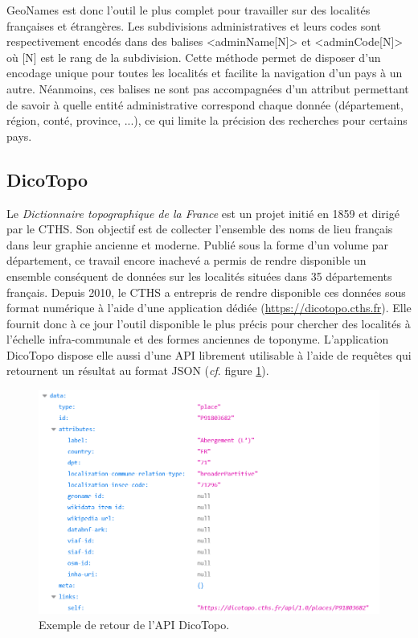 \documentclass[a4paper,12pt,twoside]{book}
\begin{document}
	
	GeoNames est donc l'outil le plus complet pour travailler sur des localités françaises et étrangères. Les subdivisions administratives et leurs codes sont respectivement encodés dans des balises <adminName[N]> et <adminCode[N]> où [N] est le rang de la subdivision. Cette méthode permet de disposer d'un encodage unique pour toutes les localités et facilite la navigation d'un pays à un autre. Néanmoins, ces balises ne sont pas accompagnées d'un attribut permettant de savoir à quelle entité administrative correspond chaque donnée (département, région, conté, province, ...), ce qui limite la précision des recherches pour certains pays.
	
	\subsection{DicoTopo}
	
	Le \textit{Dictionnaire topographique de la France} est un projet initié en 1859 et dirigé par le CTHS. Son objectif est de collecter l'ensemble des noms de lieu français dans leur graphie ancienne et moderne. Publié sous la forme d'un volume par département, ce travail encore inachevé a permis de rendre disponible un ensemble conséquent de données sur les localités situées dans 35 départements français. Depuis 2010, le CTHS a entrepris de rendre disponible ces données sous format numérique à l'aide d'une application dédiée (\url{https://dicotopo.cths.fr}). Elle fournit donc à ce jour l'outil disponible le plus précis pour chercher des localités à l'échelle infra-communale et des formes anciennes de toponyme. L'application DicoTopo dispose elle aussi d'une API librement utilisable à l'aide de requêtes qui retournent un résultat au format JSON (\textit{cf}. figure \ref{API_dicotopo}).
	
	\begin{figure}
		\centering
		\includegraphics[width=\textwidth]{Images/Result_dicotopo.png}
		\caption{Exemple de retour de l'API DicoTopo.}
		\label{API_dicotopo}
	\end{figure}
	
\end{document}
